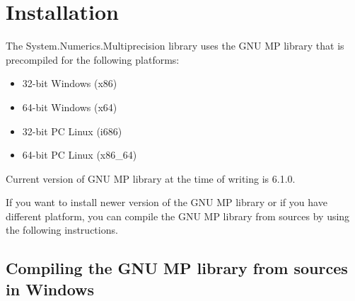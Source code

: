 \chapter{Installation}

The System.Numerics.Multiprecision library uses the GNU MP library
that is precompiled for the following platforms:

\begin{itemize}
\item 32-bit Windows (x86)
\item 64-bit Windows (x64)
\item 32-bit PC Linux (i686)
\item 64-bit PC Linux (x86\_64)
\end{itemize}

Current version of GNU MP library at the time of writing is 6.1.0.

If you want to install newer version of the GNU MP library or
if you have different platform, you can compile the GNU MP library from sources
by using the following instructions.

\section{Compiling the GNU MP library from sources in Windows}

